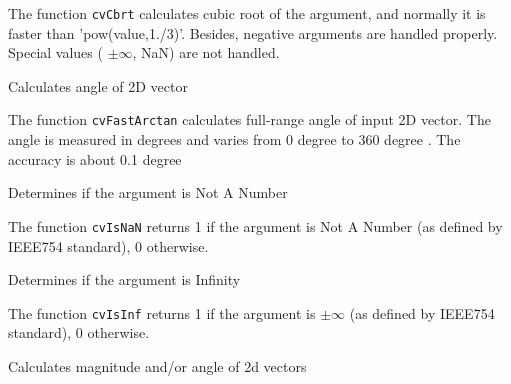 The function \texttt{cvCbrt} calculates cubic root of the argument, and normally it is faster than 'pow(value,1./3)'. Besides, negative arguments are handled properly. Special values ( $ \pm \infty $, NaN) are not handled.

\label{FastArctan}

Calculates angle of 2D vector


\begin{description}
\end{description}


The function \texttt{cvFastArctan} calculates full-range angle of input 2D vector. The angle is measured in degrees and varies from 0 degree  to 360 degree . The accuracy is about 0.1 degree 

\label{IsNaN}

Determines if the argument is Not A Number


\begin{description}
\end{description}


The function \texttt{cvIsNaN} returns 1 if the argument is Not A Number (as defined by IEEE754 standard), 0 otherwise.


\label{IsInf}

Determines if the argument is Infinity


\begin{description}
\end{description}


The function \texttt{cvIsInf} returns 1 if the argument is $ \pm \infty $ (as defined by IEEE754 standard), 0 otherwise.


\label{CartToPolar}

Calculates magnitude and/or angle of 2d vectors

